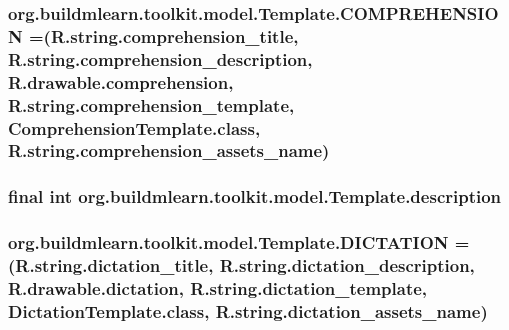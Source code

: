 \subsubsection[{\texorpdfstring{C\+O\+M\+P\+R\+E\+H\+E\+N\+S\+I\+ON}{COMPREHENSION}}]{\setlength{\rightskip}{0pt plus 5cm}org.\+buildmlearn.\+toolkit.\+model.\+Template.\+C\+O\+M\+P\+R\+E\+H\+E\+N\+S\+I\+ON =(R.\+string.\+comprehension\+\_\+title, R.\+string.\+comprehension\+\_\+description, R.\+drawable.\+comprehension, R.\+string.\+comprehension\+\_\+template, Comprehension\+Template.\+class, R.\+string.\+comprehension\+\_\+assets\+\_\+name)}\hypertarget{enumorg_1_1buildmlearn_1_1toolkit_1_1model_1_1Template_a930312f1946ad623b664609de2a4e9bc}{}\label{enumorg_1_1buildmlearn_1_1toolkit_1_1model_1_1Template_a930312f1946ad623b664609de2a4e9bc}
\subsubsection[{\texorpdfstring{description}{description}}]{\setlength{\rightskip}{0pt plus 5cm}final int org.\+buildmlearn.\+toolkit.\+model.\+Template.\+description\hspace{0.3cm}{\ttfamily [private]}}\hypertarget{enumorg_1_1buildmlearn_1_1toolkit_1_1model_1_1Template_a009374cd67d17445cfc0787899697a17}{}\label{enumorg_1_1buildmlearn_1_1toolkit_1_1model_1_1Template_a009374cd67d17445cfc0787899697a17}
\subsubsection[{\texorpdfstring{D\+I\+C\+T\+A\+T\+I\+ON}{DICTATION}}]{\setlength{\rightskip}{0pt plus 5cm}org.\+buildmlearn.\+toolkit.\+model.\+Template.\+D\+I\+C\+T\+A\+T\+I\+ON =(R.\+string.\+dictation\+\_\+title, R.\+string.\+dictation\+\_\+description, R.\+drawable.\+dictation, R.\+string.\+dictation\+\_\+template, Dictation\+Template.\+class, R.\+string.\+dictation\+\_\+assets\+\_\+name)}\hypertarget{enumorg_1_1buildmlearn_1_1toolkit_1_1model_1_1Template_a878f3878c06d1f9e5c2719c0116f3ce6}{}\label{enumorg_1_1buildmlearn_1_1toolkit_1_1model_1_1Template_a878f3878c06d1f9e5c2719c0116f3ce6}
